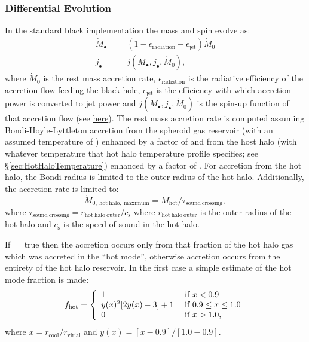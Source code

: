 \subsubsection{Differential Evolution}

In the standard black implementation the mass and spin evolve as:
\begin{eqnarray}
\dot{M}_\bullet &=& (1-\epsilon_\mathrm{radiation}-\epsilon_\mathrm{jet}) \dot{M}_0 \\
\dot{j}_\bullet &=& \dot{j}(M_\bullet,j_\bullet,\dot{M}_0),
\end{eqnarray}
where $\dot{M}_0$ is the rest mass accretion rate, $\epsilon_\mathrm{radiation}$ is the radiative efficiency of the accretion flow feeding the black hole, $\epsilon_\mathrm{jet}$ is the efficiency with which accretion power is converted to jet power and $\dot{j}(M_\bullet,j_\bullet,\dot{M}_0)$ is the spin-up function of that accretion flow (see \href{https://github.com/galacticusorg/galacticus/releases/download/masterRelease/Galacticus_Physics.pdf\#sec.AccretionDisks}{here}). The rest mass accretion rate is computed assuming Bondi-Hoyle-Lyttleton accretion from the spheroid gas reservoir (with an assumed temperature of {\normalfont \ttfamily [bondiHoyleAccretionTemperatureSpheroid]}) enhanced by a factor of {\normalfont \ttfamily [bondiHoyleAccretionEnhancementSpheroid]} and from the host halo (with whatever temperature that hot halo temperature profile specifies; see \S\ref{sec:HotHaloTemperature}) enhanced by a factor of {\normalfont \ttfamily [bondiHoyleAccretionEnhancementHotHalo]}. For accretion from the hot halo, the Bondi radius is limited to the outer radius of the hot halo. Additionally, the accretion rate is limited to:
\begin{equation}
 \dot{M}_\mathrm{0,~hot~halo,~maximum} = M_\mathrm{hot}/\tau_\mathrm{sound~crossing},
\end{equation}
where $\tau_\mathrm{sound~crossing}=r_\mathrm{hot~halo~outer}/c_\mathrm{s}$ where $r_\mathrm{hot~halo~outer}$ is the outer radius of the hot halo and $c_\mathrm{s}$ is the speed of sound in the hot halo.

If {\normalfont \ttfamily [bondiHoyleAccretionHotModeOnly]}$=${\normalfont \ttfamily true} then the accretion occurs only from that fraction of the hot halo gas which was accreted in the ``hot mode'', otherwise accretion 
occurs from the entirety of the hot halo reservoir. In the first case a simple estimate of the hot mode fraction is made:
\begin{equation}
f_\mathrm{hot} = \left\{ \begin{array}{ll} 1 & \hbox{ if } x < 0.9 \\ y(x)^2[2 y(x) - 3]+1  & \hbox{ if } 0.9 \le x \le 1.0 \\ 0 & \hbox{ if } x > 1.0, \end{array} \right.
\end{equation}
where $x = r_\mathrm{cool}/r_\mathrm{virial}$ and $y(x)=[x-0.9]/[1.0-0.9]$.


